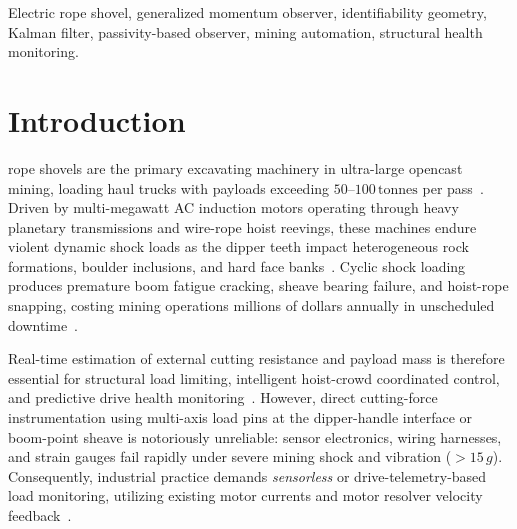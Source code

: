 \documentclass[journal]{IEEEtran}
\begin{document}
\begin{IEEEkeywords}
Electric rope shovel, generalized momentum observer, identifiability geometry, Kalman filter, passivity-based observer, mining automation, structural health monitoring.
\end{IEEEkeywords}

\section{Introduction}
 rope shovels are the primary excavating machinery in ultra-large opencast mining, loading haul trucks with payloads exceeding $50\text{--}100\,\mathrm{tonnes}$ per pass~\cite{frimpong2004, rasuli2014}. Driven by multi-megawatt AC induction motors operating through heavy planetary transmissions and wire-rope hoist reevings, these machines endure violent dynamic shock loads as the dipper teeth impact heterogeneous rock formations, boulder inclusions, and hard face banks~\cite{frimpong2008}. Cyclic shock loading produces premature boom fatigue cracking, sheave bearing failure, and hoist-rope snapping, costing mining operations millions of dollars annually in unscheduled downtime~\cite{Fu2022Novel}.

Real-time estimation of external cutting resistance and payload mass is therefore essential for structural load limiting, intelligent hoist-crowd coordinated control, and predictive drive health monitoring~\cite{rasuli2014, wu2021}. However, direct cutting-force instrumentation using multi-axis load pins at the dipper-handle interface or boom-point sheave is notoriously unreliable: sensor electronics, wiring harnesses, and strain gauges fail rapidly under severe mining shock and vibration ($>15\,g$). Consequently, industrial practice demands \emph{sensorless} or drive-telemetry-based load monitoring, utilizing existing motor currents and motor resolver velocity feedback~\cite{wahrburg2015, hu2017}.
\end{document}
